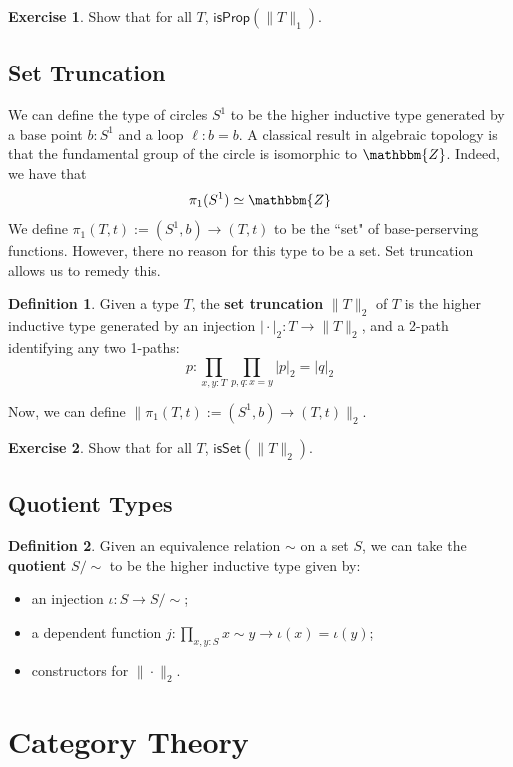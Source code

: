 \documentclass{amsart}
\theoremstyle{definition}
\newtheorem{ex}{Exercise}[section]
\newtheorem{defn}{Definition}[section]
\newcommand{\Z}{\mathbbm{Z}}
\newcommand{\isProp}{\ensuremath{\mathsf{isProp}}}
\newcommand{\isSet}{\ensuremath{\mathsf{isSet}}}
\renewcommand{\emph}{\textbf}
\begin{document}
\begin{ex}
    Show that for all $T$, $\isProp(\| T \|_1)$.
\end{ex}

\subsection{Set Truncation}\label{sec:set-truncation}
We can define the type of circles $S^{1}$ to be the higher inductive type generated by a base point $b : S^{1}$ and a loop $\ell : b = b$.
A classical result in algebraic topology is that the fundamental group of the circle is isomorphic to $\Z$.
Indeed, we have that
\[
    \pi_{1}(S^{1}) \simeq \Z
\]
We define $\pi_{1}(T, t) := (S^{1}, b) \to (T, t)$ to be the ``set" of base-perserving functions.
However, there no reason for this type to be a set.
Set truncation allows us to remedy this.
\begin{defn}
    Given a type $T$, the \emph{set truncation} $\| T \|_2$ of $T$ is the higher inductive type generated by an injection $\vert \cdot \vert_2 : T \to \| T \|_2$, and a 2-path identifying any two 1-paths:
    \[p : \prod_{x,y : T}\prod_{p,q : x = y} \vert p \vert_2 = \vert q \vert_2\]
\end{defn}
Now, we can define $\| \pi_{1}(T, t) := (S^{1}, b) \to (T, t) \|_{2}$.
\begin{ex}
    Show that for all $T$, $\isSet(\| T \|_2)$.
\end{ex}

\subsection{Quotient Types}\label{sec:quotient-types}
\begin{defn}
    Given an equivalence relation $\sim$ on a set $S$, we can take the \emph{quotient} $S/\sim$ to be the higher inductive type given by:
    \begin{itemize}
        \item an injection $\iota : S \to S/\sim$;
        \item a dependent function $j : \prod_{x, y : S} x \sim y \to \iota(x) = \iota(y)$;
        \item constructors for $\| \cdot \|_2$.
    \end{itemize}
\end{defn}

\section{Category Theory}
\end{document}
